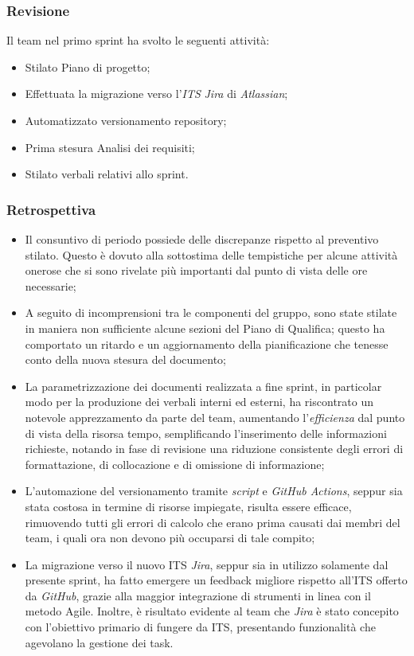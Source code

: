 \documentclass[10pt, a4paper]{article}
\begin{document}
\subsubsection{Revisione}
Il team nel primo sprint ha svolto le seguenti attività:
\begin{itemize}
    \item Stilato Piano di progetto;
    \item Effettuata la migrazione verso l'\textit{ITS\pg} \textit{Jira\pg} di \textit{Atlassian};
    \item Automatizzato versionamento repository;
    \item Prima stesura Analisi dei requisiti;
    \item Stilato verbali relativi allo sprint.
\end{itemize}
\subsubsection{Retrospettiva}
\begin{itemize}
\item Il consuntivo di periodo possiede delle discrepanze rispetto al preventivo stilato. Questo è dovuto alla sottostima delle 
tempistiche per alcune attività onerose che si sono rivelate più importanti dal punto di vista delle ore necessarie;
\item A seguito di incomprensioni tra le componenti del gruppo, sono state stilate in maniera non sufficiente alcune sezioni del 
Piano di Qualifica; questo ha comportato un ritardo e un aggiornamento della pianificazione che tenesse conto della nuova stesura del documento;
\item La parametrizzazione dei documenti realizzata a fine sprint, in particolar modo per la produzione dei verbali interni ed esterni, ha riscontrato un notevole apprezzamento
da parte del team, aumentando l'\textit{efficienza\pg} dal punto di vista della risorsa tempo, semplificando l'inserimento delle informazioni richieste, notando
in fase di revisione una riduzione consistente degli errori di formattazione, di collocazione e di omissione di informazione;
\item L'automazione del versionamento tramite \textit{script\pg} e \textit{GitHub Actions\pg}, seppur sia stata costosa in termine di risorse impiegate,
risulta essere efficace, rimuovendo tutti gli errori di calcolo che erano prima causati dai membri del team, i quali ora non devono più occuparsi di tale compito;
\item La migrazione verso il nuovo ITS \textit{Jira}, seppur sia in utilizzo solamente dal presente sprint, ha fatto emergere un feedback migliore rispetto all'ITS 
offerto da \textit{GitHub}, grazie alla maggior integrazione di strumenti in linea con il metodo Agile. Inoltre, è risultato evidente al team che \textit{Jira} è stato concepito 
con l'obiettivo primario di fungere da ITS, presentando funzionalità che agevolano la gestione dei task.
\end{itemize}
\end{document}
